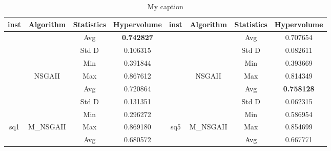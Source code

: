 \begin{table}[]
	\centering
	\caption{My caption}
	\label{my-label}
	\begin{tabular}{cccccccc}
		\hline
		inst                  & Algorithm                   & Statistics & Hypervolume       & inst                  & Algorithm                                           & Statistics & Hypervolume       \\ \hline
		&                             & Avg        & \textbf{0.742827} &                       &                                                     & Avg        & 0.707654          \\ \cline{3-4} \cline{7-8} 
		&                             & Std D      & 0.106315          &                       &                                                     & Std D      & 0.082611          \\ \cline{3-4} \cline{7-8} 
		&                             & Min        & 0.391844          &                       &                                                     & Min        & 0.393669          \\ \cline{3-4} \cline{7-8} 
		& \multirow{-4}{*}{NSGAII}    & Max        & 0.867612          &                       & \multirow{-4}{*}{NSGAII}                            & Max        & 0.814349          \\ \cline{2-4} \cline{6-8} 
		&                             & Avg        & 0.720864          &                       & \cellcolor[HTML]{C0C0C0}                            & Avg        & \textbf{0.758128} \\ \cline{3-4} \cline{7-8} 
		&                             & Std D      & 0.131351          &                       & \cellcolor[HTML]{C0C0C0}                            & Std D      & 0.062315          \\ \cline{3-4} \cline{7-8} 
		&                             & Min        & 0.296272          &                       & \cellcolor[HTML]{C0C0C0}                            & Min        & 0.586954          \\ \cline{3-4} \cline{7-8} 
		\multirow{-8}{*}{sq1} & \multirow{-4}{*}{M\_NSGAII} & Max        & 0.869180          & \multirow{-8}{*}{sq5} & \multirow{-4}{*}{\cellcolor[HTML]{C0C0C0}M\_NSGAII} & Max        & 0.854699          \\ \hline
		&                             & Avg        & 0.680572          &                       &                                                     & Avg        & 0.667771          \\ \cline{3-4} \cline{7-8} 

\end{tabular}
\end{table}
